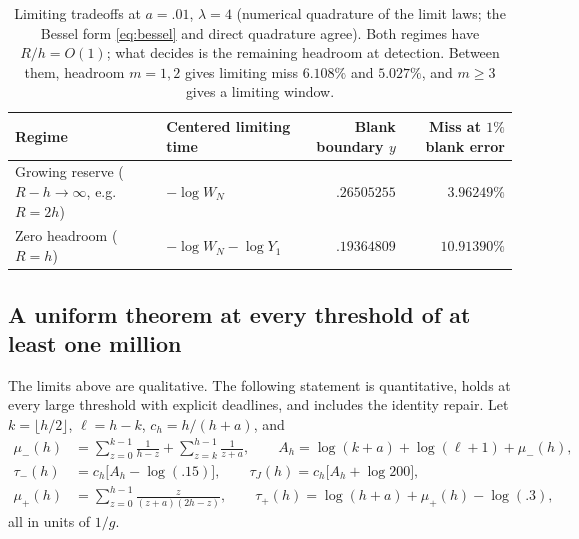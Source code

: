 \documentclass[11pt,a4paper]{article}
\theoremstyle{plain}
\theoremstyle{definition}
\theoremstyle{remark}
\begin{document}
\begin{table}[htbp]\centering\footnotesize\setlength{\tabcolsep}{4pt}
\begin{tabular}{p{.30\linewidth}lrr}\toprule
Regime & Centered limiting time & Blank boundary $y$ & Miss at $1\%$ blank error\\\midrule
Growing reserve ($R-h\to\infty$, e.g.\ $R=2h$) & $-\log W_N$ & $.26505255$ & $3.96249\%$\\
Zero headroom ($R=h$) & $-\log W_N-\log Y_1$ & $.19364809$ & $10.91390\%$\\\bottomrule
\end{tabular}
\caption{Limiting tradeoffs at $a=.01$, $\lambda=4$ (numerical quadrature of the limit laws; the Bessel form \eqref{eq:bessel} and direct quadrature agree). Both regimes have $R/h=O(1)$; what decides is the remaining headroom at detection. Between them, headroom $m=1,2$ gives limiting miss $6.108\%$ and $5.027\%$, and $m\ge3$ gives a limiting window.}\label{tab:limits}
\end{table}

\subsection{A uniform theorem at every threshold of at least one million}
The limits above are qualitative. The following statement is quantitative, holds at every large threshold with explicit deadlines, and includes the identity repair. Let $k=\lfloor h/2\rfloor$, $\ell=h-k$, $c_h=h/(h+a)$, and
\begin{align}
\mu_-(h)&=\sum_{z=0}^{k-1}\frac1{h-z}+\sum_{z=k}^{h-1}\frac1{z+a},\qquad A_h=\log(k+a)+\log(\ell+1)+\mu_-(h),\label{eq:Ah}\\
\tau_-(h)&=c_h\bigl[A_h-\log(.15)\bigr],\qquad\tau_J(h)=c_h\bigl[A_h+\log200\bigr],\label{eq:tauminus}\\
\mu_+(h)&=\sum_{z=0}^{h-1}\frac{z}{(z+a)(2h-z)},\qquad\tau_+(h)=\log(h+a)+\mu_+(h)-\log(.3),\label{eq:tauplus}
\end{align}
all in units of $1/g$.
\end{document}

